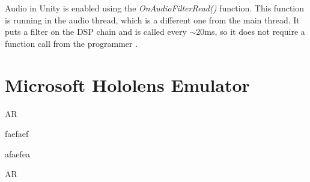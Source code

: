 Audio in Unity\textsuperscript{\textregistered} is enabled using the \textit{OnAudioFilterRead()} function. This function is running in the audio thread, which is a different one from the main thread. It puts a filter on the DSP chain and is called every $\sim 20$ms, so it does not require a function call from the programmer \cite{bib:unity_doc}.

\section{Microsoft Hololens Emulator}

\gls{AR} 

faefaef


afaefea

\gls{AR}

